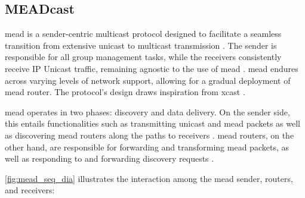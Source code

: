 \subsection{MEADcast} %
\label{sub:MEADcast}
\gls{mead} is a sender-centric multicast protocol designed to facilitate a
    seamless transition from extensive unicast to multicast transmission
    \cite{meadcast2}.
The sender is responsible for all group management tasks, while the receivers
    consistently receive IP Unicast traffic, remaining agnostic to the use
    of \gls{mead} \cite{meadcast1}.
\gls{mead} endures across varying levels of network support, allowing for a
    gradual deployment of \gls{mead} router.
The protocol's design draws inspiration from \gls{xcast} \cite{meadcast1}.

\gls{mead} operates in two phases: discovery and data delivery.
On the sender side, this entails functionalities such as transmitting unicast
    and \gls{mead} packets as well as discovering \gls{mead} routers along the
    paths to receivers \cite{meadcast2}.
\gls{mead} routers, on the other hand, are responsible for forwarding and
    transforming \gls{mead} packets, as well as responding to and forwarding
    discovery requests \cite{meadcast2}.

\autoref{fig:mead_seq_dia} illustrates the interaction among the \gls{mead}
    sender, routers, and receivers: \cite{meadcast2}

